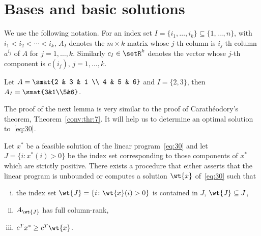 \section{Bases and basic solutions}
\label{sec:bases-basic-solut}


We use the following notation.  For an index set
$I=\{i_1,\ldots,i_k\}\subseteq\{1,\ldots,n\}$, with $i_1<i_2<\cdots<i_k$, $A_I$ denotes
the $m\times k$ matrix whose $j$-th column is $i_j$-th column $a^{i_j}$ of
$A$ for $j=1,\ldots,k$.
Similarly $c_I\in \setR^k$ denotes the vector whose $j$-th component is
$c(i_j)$, $j=1,\ldots,k$.   
\begin{example}
  \label{ex:-2}
  Let $A =\smat{2 & 3 & 1 \\ 4 & 5 & 6}$ and $I = \{2,3\}$, then $A_I
  = \smat{3&1\\5&6}$.   
\end{example}
The proof of the next lemma is very similar to
the proof of Carath\'eodory's theorem, Theorem~\ref{conv:thr:7}.
It will help us to determine an optimal solution to~\eqref{eq:30}.



  \begin{lemma}
    \label{lem:8}    
    Let $x^*$ be a feasible solution of the linear
    program~\eqref{eq:30} and let $J = \{i \colon x^*(i)>0\}$ be the index
    set corresponding to those components of $x^*$ which are strictly
    positive. There exists a procedure that either asserts that the
    linear program is unbounded or computes a solution $\wt{x}$
    of~\eqref{eq:30} such that
    \begin{enumerate}[i)]
    \item     the index set $\wt{J}= \{ i \colon \wt{x}(i)>0\}$ is
       contained in $J$, $\wt{J}\subseteq J$,
    \item $A_{\wt{J}}$ has full column-rank,
    \item $c^Tx^* \geq c^T\wt{x}$. 
    \end{enumerate}

  \end{lemma}


